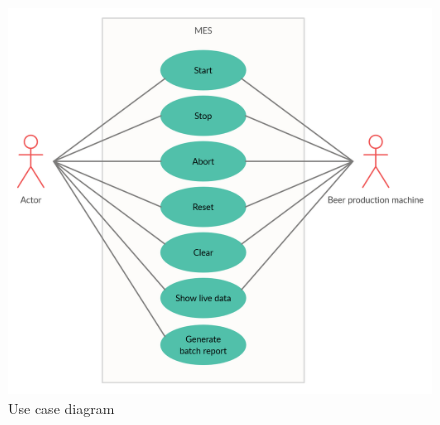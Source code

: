 \begin{figure}[ht]
	\centering 
	\includegraphics[scale=0.3]{images/ucdiagram.png}
	\caption{Use case diagram}
	\label{figure:ucdiagram} 
\end{figure}
